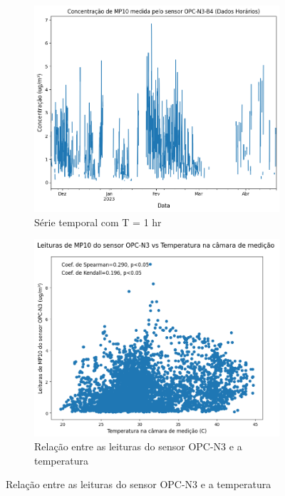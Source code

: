 \begin{figure}[h]
    \centering
    \caption{Série temporal horária das leituras do sensor OPC-N3 e sua relação com a temperatura}
    \begin{subfigure}{0.495\textwidth}
        \includegraphics[width=\textwidth]{chapters/3-RESULTADOS CAMPO/Figuras/preproc-1HR-pm10.png}
        \caption{Série temporal com T = 1 hr}
        \label{fig:data-pm10-preproc-1HR}
    \end{subfigure}
    \hfill
    \begin{subfigure}{0.495\textwidth}
        \includegraphics[width=\textwidth]{chapters/3-RESULTADOS CAMPO/Figuras/temperature-pm10.png}
        \caption{Relação entre as leituras do sensor OPC-N3 e a temperatura}
        \label{fig:data-temp-pm10-corr}
    \end{subfigure}
\end{figure}


